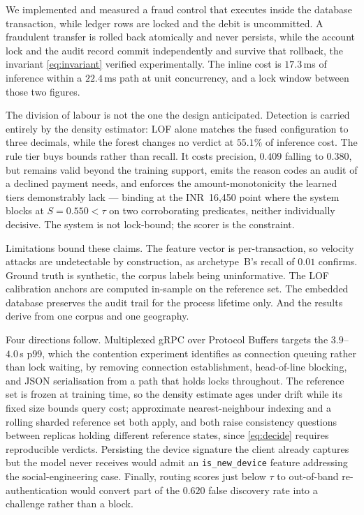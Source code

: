 \documentclass[conference]{IEEEtran}
\newcommand{\INR}[1]{\mbox{INR~#1}}
\begin{document}
We implemented and measured a fraud control that executes inside the
database transaction, while ledger rows are locked and the debit is
uncommitted. A fraudulent transfer is rolled back atomically and never
persists, while the account lock and the audit record commit
independently and survive that rollback, the invariant
\eqref{eq:invariant} verified experimentally. The inline cost is
$17.3$\,ms of inference within a $22.4$\,ms path at unit concurrency,
and a lock window between those two figures.

The division of labour is not the one the design anticipated. Detection
is carried entirely by the density estimator: LOF alone matches the
fused configuration to three decimals, while the forest changes no
verdict at $55.1\%$ of inference cost. The rule tier buys bounds rather
than recall. It costs precision, $0.409$ falling to $0.380$, but
remains valid beyond the training support, emits the reason codes an
audit of a declined payment needs, and enforces the
amount-monotonicity the learned tiers demonstrably lack --- binding at
the \INR{16{,}450} point where the system blocks at $S = 0.550 < \tau$
on two corroborating predicates, neither individually decisive.
The system is not lock-bound; the scorer is the constraint.

Limitations bound these claims. The feature vector is
per-transaction, so velocity attacks are undetectable by construction,
as archetype~B's recall of $0.01$ confirms. Ground truth is synthetic,
the corpus labels being uninformative. The LOF calibration anchors are
computed in-sample on the reference set. The embedded database
preserves the audit trail for the process lifetime only. And the
results derive from one corpus and one geography.

Four directions follow. Multiplexed gRPC over Protocol Buffers targets
the $3.9$--$4.0$\,s p99, which the contention experiment identifies as
connection queuing rather than lock waiting, by removing connection
establishment, head-of-line blocking, and JSON serialisation from a
path that holds locks throughout. The reference set is frozen at
training time, so the density estimate ages under drift while its fixed
size bounds query cost; approximate nearest-neighbour indexing and a
rolling sharded reference set both apply, and both raise consistency
questions between replicas holding different reference states, since
\eqref{eq:decide} requires reproducible verdicts. Persisting the device
signature the client already captures but the model never receives
would admit an \texttt{is\_new\_device} feature addressing the
social-engineering case. Finally, routing scores just below $\tau$ to
out-of-band re-authentication would convert part of the $0.620$ false
discovery rate into a challenge rather than a block.



\end{document}
